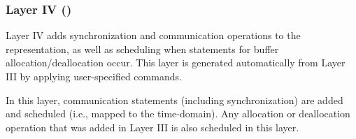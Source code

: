 \subsubsection{Layer IV (\Layerfour)}
\label{layer4}

Layer IV adds synchronization and communication operations to the representation,  as well as scheduling when statements for buffer allocation/deallocation occur.  This layer is generated automatically from Layer III by applying user-specified commands.

In this layer, communication statements (including synchronization) are added and scheduled (i.e., mapped to the time-\processor domain).
Any allocation or deallocation operation that was added in Layer III is also scheduled in this layer.